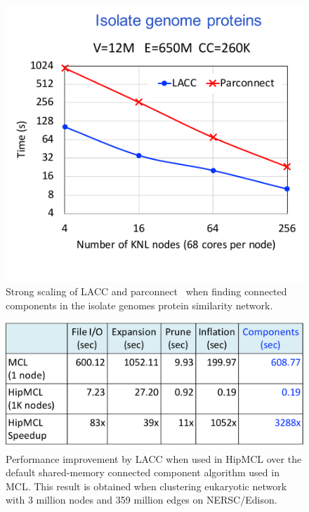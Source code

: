 \begin{figure}[!t]
   \centering
   \includegraphics[scale=.5]{figures/isolates} %
   \caption{Strong scaling of LACC and parconnect~\cite{jain2017adaptive} when finding connected components in  the isolate genomes protein similarity network. }
   \label{fig:isolates}
\end{figure}

\begin{figure}[!t]
   \centering
   \includegraphics[scale=.5]{figures/hipmcl} %
   \caption{Performance improvement by LACC when used in HipMCL over the default shared-memory connected component algorithm used in MCL. This result is obtained when clustering eukaryotic network with 3 million nodes and 359 million edges on NERSC/Edison.}
   \label{fig:hipmcl}
\end{figure}


